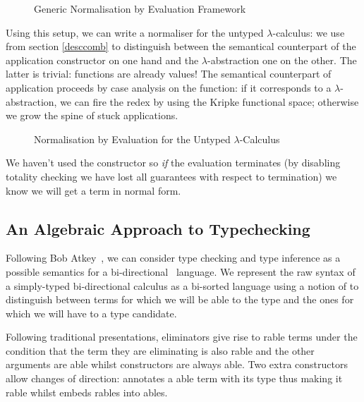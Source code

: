 \begin{figure}[h]
\caption{Generic Normalisation by Evaluation Framework}
\end{figure}

Using this setup, we can write a normaliser for the untyped
$\lambda$-calculus: we use  from section \ref{desccomb} to distinguish between
the semantical counterpart of the application constructor on
one hand and the $\lambda$-abstraction one on the other.
The latter is trivial: functions are already
values! The semantical counterpart of application proceeds by
case analysis on the function: if it corresponds to a
$\lambda$-abstraction, we can fire the redex by using the Kripke
functional space; otherwise we grow the spine of stuck
applications.

\begin{figure}[h]
\caption{Normalisation by Evaluation for the Untyped $\lambda$-Calculus}
\end{figure}

We haven't used the  constructor so \emph{if} the evaluation terminates
(by disabling totality checking we have lost all guarantees with respect to
termination) we know we will get a term in normal form.

\subsection{An Algebraic Approach to Typechecking}

Following Bob Atkey~\citeyear{atkey2015algebraic}, we can consider type checking
and type inference as a possible semantics for a bi-directional~\cite{pierce2000local}
language. We represent the raw syntax of a simply-typed bi-directional calculus
as a bi-sorted language using a notion of  to distinguish between terms
for which we will be able to  the type and the ones for which we will
have to  a type candidate.

Following traditional presentations, eliminators give rise to rable
terms under the condition that the term they are eliminating is also rable
and the other arguments are able whilst constructors are always able.
Two extra constructors allow changes of direction:  annotates a able
term with its type thus making it rable whilst  embeds rables
into ables.

